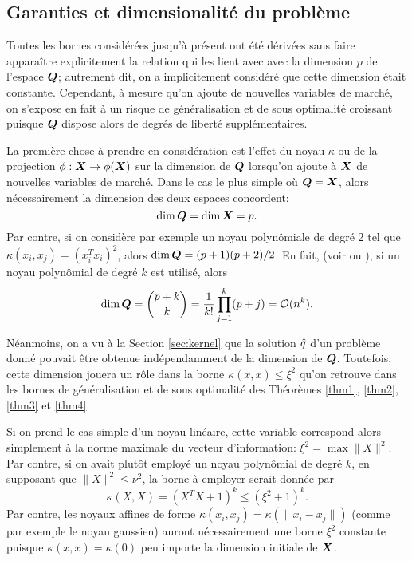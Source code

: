 \subsection{Garanties et dimensionalité du problème}
\label{b:dim}

Toutes les bornes considérées jusqu'à présent ont été dérivées sans faire apparaître
explicitement la relation qui les lient avec avec la dimension $p$ de l'espace $\bm Q$;
autrement dit, on a implicitement considéré que cette dimension était
constante. Cependant, à mesure qu'on ajoute de nouvelles variables de marché, on s'expose
en fait à un risque de généralisation et de sous optimalité croissant puisque $\bm Q$ dispose
alors de degrés de liberté supplémentaires.

La première chose à prendre en considération est l'effet du noyau $\kappa$ ou de la projection
$\phi:\bm{X}\to\phi(\bm{X})$ sur la dimension de $\bm Q$ lorsqu'on ajoute à $\bm{X}$ de nouvelles variables de
marché. Dans le cas le plus simple où $\bm Q = \bm{X}$, alors nécessairement la dimension des
deux espaces concordent:
\begin{equation}
  \dim\bm Q = \dim\bm{X} = p.
\end{equation}
Par contre, si on considère par exemple un noyau polynômiale de degré 2 tel que
$\kappa(x_i,x_j) = (x_i^Tx_i)^2$, alors $\dim\bm Q = (p+1)(p+2)/2$. En fait, (voir
\cite{mohri2012foundations} ou \cite{bishop2006pattern}), si un noyau polynômial de degré
$k$ est utilisé, alors
\begin{equation}
  \dim\bm Q = \binom{p+k}{k} = \frac{1}{k!}\prod_{j=1}^k(p+j) = \mathcal O(n^k).
\end{equation}

Néanmoins, on a vu à la Section \ref{sec:kernel} que la solution $\hat q$ d'un problème donné
pouvait être obtenue indépendamment de la dimension de $\bm Q$. Toutefois, cette dimension
jouera un rôle dans la borne $\kappa(x,x) \leq \xi^2$ qu'on retrouve dans les bornes de
généralisation et de sous optimalité des Théorèmes \ref{thm1}, \ref{thm2}, \ref{thm3} et
\ref{thm4}.

Si on prend le cas simple d'un noyau linéaire, cette variable correspond alors simplement
à la norme maximale du vecteur d'information: $\xi^2 = \max\|X\|^2$.  Par contre, si on
avait plutôt employé un noyau polynômial de degré $k$, en supposant que $\|X\|^2 \leq \nu^2$, la
borne à employer serait donnée par
\begin{equation}
\kappa(X,X) = (X^TX + 1)^k \leq (\xi^2 + 1)^k.
\end{equation}
Par contre, les noyaux affines de forme $\kappa(x_i,x_j) = \kappa(\|x_i - x_j\|)$ (comme par exemple
le noyau gaussien) auront nécessairement une borne $\xi^2$ constante puisque
$\kappa(x,x) = \kappa(0)$ peu importe la dimension initiale de $\bm{X}$.

